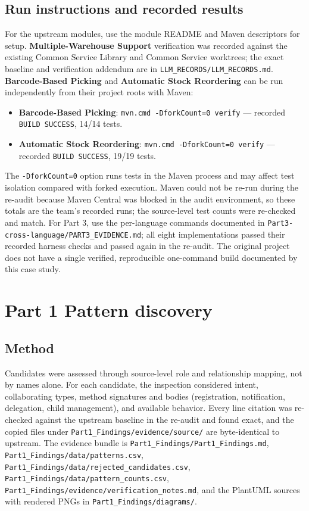\documentclass[11pt,a4paper]{article}
\newcommand{\code}[1]{\nolinkurl{#1}}
\begin{document}
\subsection{Run instructions and recorded results}
For the upstream modules, use the module README and Maven descriptors for setup. \textbf{Multiple-Warehouse Support} verification was recorded against the existing Common Service Library and Common Service worktrees; the exact baseline and verification addendum are in \code{LLM_RECORDS/LLM_RECORDS.md}. \textbf{Barcode-Based Picking} and \textbf{Automatic Stock Reordering} can be run independently from their project roots with Maven:
\begin{itemize}[nosep]
\item \textbf{Barcode-Based Picking}: \code{mvn.cmd -DforkCount=0 verify} --- recorded \texttt{BUILD SUCCESS}, 14/14 tests.
\item \textbf{Automatic Stock Reordering}: \code{mvn.cmd -DforkCount=0 verify} --- recorded \texttt{BUILD SUCCESS}, 19/19 tests.
\end{itemize}
The \code{-DforkCount=0} option runs tests in the Maven process and may affect test isolation compared with forked execution. Maven could not be re-run during the re-audit because Maven Central was blocked in the audit environment, so these totals are the team's recorded runs; the source-level test counts were re-checked and match. For Part 3, use the per-language commands documented in \code{Part3-cross-language/PART3_EVIDENCE.md}; all eight implementations passed their recorded harness checks and passed again in the re-audit. The original project does not have a single verified, reproducible one-command build documented by this case study.

\section{Part 1 Pattern discovery}

\subsection{Method}
Candidates were assessed through source-level role and relationship mapping, not by names alone. For each candidate, the inspection considered intent, collaborating types, method signatures and bodies (registration, notification, delegation, child management), and available behavior. Every line citation was re-checked against the upstream baseline in the re-audit and found exact, and the copied files under \code{Part1_Findings/evidence/source/} are byte-identical to upstream. The evidence bundle is \code{Part1_Findings/Part1_Findings.md}, \code{Part1_Findings/data/patterns.csv}, \code{Part1_Findings/data/rejected_candidates.csv}, \code{Part1_Findings/data/pattern_counts.csv}, \code{Part1_Findings/evidence/verification_notes.md}, and the PlantUML sources with rendered PNGs in \code{Part1_Findings/diagrams/}.
\end{document}
